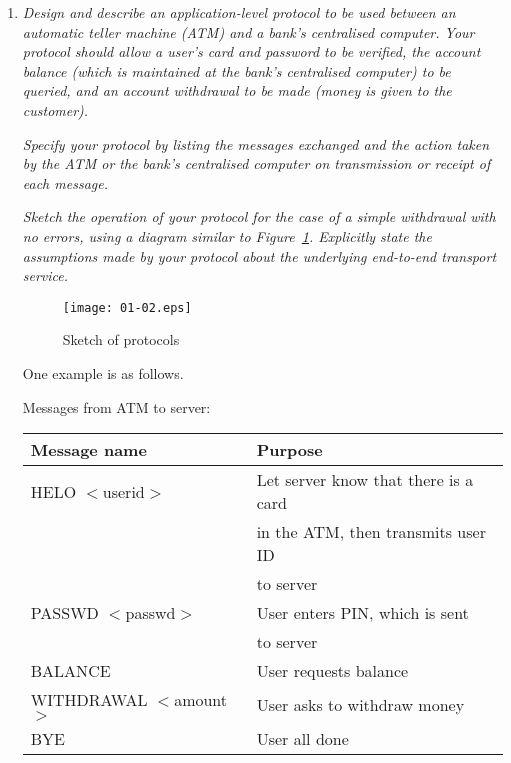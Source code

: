 \documentclass[11pt,a4paper]{article}
\begin{document}
\begin{enumerate}

  \item \emph{Design and describe an application-level protocol to be
  used between an automatic teller machine (ATM) and a bank's
  centralised computer. Your protocol should allow a user's card and
  password to be verified, the account balance (which is maintained at
  the bank's centralised computer) to be queried, and an account
  withdrawal to be made (money is given to the customer).}

  \emph{Specify your protocol by listing the messages exchanged and
  the action taken by the ATM or the bank's centralised computer on
  transmission or receipt of each message.}

  \emph{Sketch the operation of your protocol for the case of a simple
  withdrawal with no errors, using a diagram similar to
  Figure~\ref{protocols}. Explicitly state the assumptions made by
  your protocol about the underlying end-to-end transport service.}

  \begin{figure}
  \begin{center}
  \texttt{[image: 01-02.eps]}
  \caption{Sketch of protocols}\label{protocols}
  \end{center}
  \end{figure}
 
  One example is as follows.

  Messages from ATM to server:

  {\small
  \begin{tabular}{l|l}
  Message name & Purpose\\
  \hline \hline
  HELO \(<\)userid\(>\)   & Let server know that there is a card\\
                          & in the ATM, then transmits user ID\\
                          & to server\\
  PASSWD \(<\)passwd\(>\) & User enters PIN, which is sent\\
                          & to server\\
  BALANCE                 & User requests balance\\
  WITHDRAWAL \(<\)amount\(>\) 
                          & User asks to withdraw money\\
  BYE                     & User all done
  \end{tabular}
  }

  \medskip


\end{enumerate}
\end{document}
